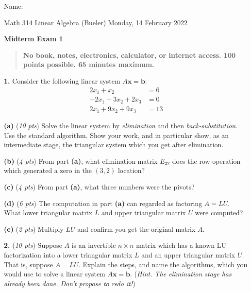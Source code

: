 \documentclass[11pt]{amsart}
\newcommand{\bb}{\mathbf{b}}
\newcommand{\bx}{\mathbf{x}}
\newcommand{\prob}[1]{\bigskip\noindent\textbf{#1.} }
\newcommand{\pts}[1]{(\emph{#1 pts})}
\newcommand{\probpts}[2]{\prob{#1} \pts{#2} \quad}
\newcommand{\epartpts}[2]{\medskip\noindent \textbf{(#1)} \pts{#2} \quad}
\begin{document}
\hfill \Large Name:\underline{\phantom{Ed Bueler really really long long long name}}
\medskip

\scriptsize \noindent Math 314 Linear Algebra (Bueler) \hfill Monday, 14 February 2022
\medskip

\LARGE\centerline{\textbf{Midterm Exam 1}}

\smallskip
\begin{quote}
\large
\textbf{No book, notes, electronics, calculator, or internet access.  100 points possible. 65 minutes maximum.}
\end{quote}

\normalsize
\medskip

\thispagestyle{empty}

\prob{1}  Consider the following linear system $A\bx = \bb$:
\begin{align*}
2 x_1 + x_2 \phantom{+ 0x_3} &= 6 \\
-2 x_1 + 3 x_2 + 2 x_3 &= 0 \\
2 x_1 + 9 x_2 + 9 x_3 &= 13
\end{align*}
\begin{comment}
x =      2
         2
        -1
L =      1         0         0
        -1         1         0
         1         2         1
U =      2         1         0
         0         4         2
         0         0         5
\end{comment}

\epartpts{a}{10}  Solve the linear system by \emph{elimination} and then \emph{back-substitution}.  Use the standard algorithm.  Show your work, and in particular show, as an intermediate stage, the triangular system which you get after elimination.
\vfill

\clearpage
\newpage
\epartpts{b}{4}  From part \textbf{(a)}, what elimination matrix $E_{32}$ does the row operation which generated a zero in the $(3,2)$ location?
\vfill

\epartpts{c}{4}  From part \textbf{(a)}, what three numbers were the pivots?
\vfill

\epartpts{d}{6}  The computation in part \textbf{(a)} can regarded as factoring $A=LU$.  What lower triangular matrix $L$ and upper triangular matrix $U$ were computed?
\vfill

\epartpts{e}{2}  Multiply $LU$ and confirm you get the original matrix $A$.
\vfill

\clearpage
\newpage
\probpts{2}{10}  Suppose $A$ is an invertible $n\times n$ matrix which has a known LU factorization into a lower triangular matrix $L$ and an upper triangular matrix $U$.  That is, suppose $A=LU$.  Explain the steps, and name the algorithms, which you would use to solve a linear system $A\bx=\bb$.  (\emph{Hint.  The elimination stage has already been done.  Don't propose to redo it!})
\vfill
\end{document}
